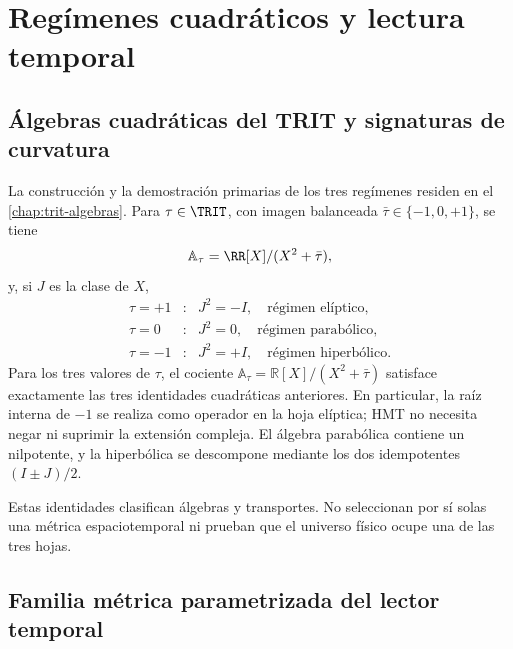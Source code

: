 
\chapter{Regímenes cuadráticos y lectura temporal}
\label{chap:regimenes-cuadraticos-tiempo}

\section{Álgebras cuadráticas del TRIT y signaturas de curvatura}
\label{sec:regimenes-cuadraticos-recibidos}

La construcción y la demostración primarias de los tres regímenes residen en
el \cref{chap:trit-algebras}. Para
\(\tau\in\TRIT\), con imagen balanceada
\(\bar\tau\in\{-1,0,+1\}\), se tiene
\[
 \mathbb A_\tau=\RR[X]/(X^2+\bar\tau),
\]
y, si \(J\) es la clase de \(X\),
\[
\begin{array}{ccl}
 \tau=+1&:&J^2=-I,\quad\text{régimen elíptico},\\
 \tau=0&:&J^2=0,\quad\text{régimen parabólico},\\
 \tau=-1&:&J^2=+I,\quad\text{régimen hiperbólico}.
\end{array}
\]
Para los tres valores de \(\tau\), el cociente
\(\mathbb A_\tau=\mathbb R[X]/(X^2+\bar\tau)\) satisface exactamente las tres
identidades cuadráticas anteriores. En particular, la raíz interna de
\(-1\) se realiza como operador en la hoja elíptica; HMT no necesita negar ni
suprimir la extensión compleja. El álgebra parabólica contiene un nilpotente,
y la hiperbólica se descompone mediante los dos idempotentes
\((I\pm J)/2\).

Estas identidades clasifican álgebras y transportes. No seleccionan por sí
solas una métrica espaciotemporal ni prueban que el universo físico ocupe una
de las tres hojas.

\section{Familia métrica parametrizada del lector temporal}
\label{sec:ansatz-metrico-tres-curvaturas}

